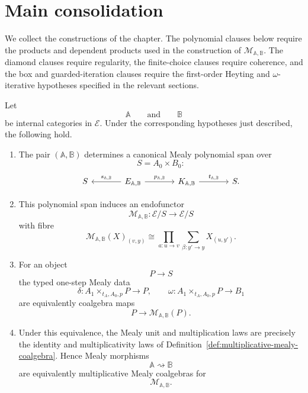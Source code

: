\section{Main consolidation}
\label{sec:polynomial-guarded-main-consolidation}

We collect the constructions of the chapter. The polynomial clauses below
require the products and dependent products used in the construction of
\(\mathcal M_{\mathbb A,\mathbb B}\). The diamond clauses require
regularity, the finite-choice clauses require coherence, and the box and
guarded-iteration clauses require the first-order Heyting and
\(\omega\)-iterative hypotheses specified in the relevant sections.

\begin{theorem}
\label{thm:polynomial-mealy-spans-guarded-consolidation}
Let
\[
\mathbb A
\qquad
\text{and}
\qquad
\mathbb B
\]
be internal categories in \(\mathcal E\). Under the corresponding
hypotheses just described, the following hold.

\begin{enumerate}
\item The pair \((\mathbb A,\mathbb B)\) determines a canonical Mealy
polynomial span over
\[
S=A_0\times B_0:
\]
\[
\begin{tikzcd}[column sep=large]
S
&
E_{\mathbb A,\mathbb B}
  \arrow[l, "s_{\mathbb A,\mathbb B}"']
  \arrow[r, "p_{\mathbb A,\mathbb B}"]
&
K_{\mathbb A,\mathbb B}
  \arrow[r, "t_{\mathbb A,\mathbb B}"]
&
S .
\end{tikzcd}
\]

\item This polynomial span induces an endofunctor
\[
\mathcal M_{\mathbb A,\mathbb B}:\mathcal E/S\to\mathcal E/S
\]
with fibre
\[
\mathcal M_{\mathbb A,\mathbb B}(X)_{(v,y)}
\cong
\prod_{a:u\to v}
\sum_{\beta:y'\to y}
X_{(u,y')}.
\]

\item For an object
\[
P\to S
\]
the typed one-step Mealy data
\[
\delta:
A_1\times_{t_A,A_0,p}P\to P,
\qquad
\omega:
A_1\times_{t_A,A_0,p}P\to B_1
\]
are equivalently coalgebra maps
\[
P\to\mathcal M_{\mathbb A,\mathbb B}(P).
\]

\item Under this equivalence, the Mealy unit and multiplication laws are
precisely the identity and multiplicativity laws of
Definition~\ref{def:multiplicative-mealy-coalgebra}. Hence Mealy
morphisms
\[
\mathbb A\rightsquigarrow\mathbb B
\]
are equivalently multiplicative Mealy coalgebras for
\[
\mathcal M_{\mathbb A,\mathbb B}.
\]


\end{enumerate}
\end{theorem}
